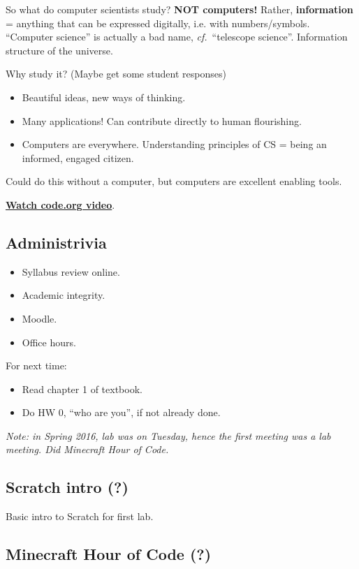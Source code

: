 \documentclass{article}
\begin{document}
So what do computer scientists study?  \textbf{NOT computers!}
Rather, \textbf{information} = anything that can be expressed digitally,
i.e. with numbers/symbols.  ``Computer science'' is actually a bad
name, \emph{cf.}\ ``telescope science''.  Information structure of the
universe.

Why study it?  (Maybe get some student responses)
\begin{itemize}
\item Beautiful ideas, new ways of thinking.
\item Many applications!  Can contribute directly to human flourishing.
\item Computers are everywhere.  Understanding principles of CS =
  being an informed, engaged citizen.
\end{itemize}
Could do this without a computer, but computers are excellent enabling
tools.

\href{https://www.youtube.com/watch?v=qYZF6oIZtfc}{\textbf{Watch code.org video}}.

\subsection*{Administrivia}

\begin{itemize}
\item Syllabus review online.
\item Academic integrity.
\item Moodle.
\item Office hours.
\end{itemize}

For next time:

\begin{itemize}
\item Read chapter 1 of textbook.
\item Do HW 0, ``who are you'', if not already done.
\end{itemize}

\emph{Note: in Spring 2016, lab was on Tuesday, hence the first
  meeting was a lab meeting.  Did Minecraft Hour of Code.}

\subsection*{Scratch intro (?)}

Basic intro to Scratch for first lab.

\subsection*{Minecraft Hour of Code (?)}
\end{document}
